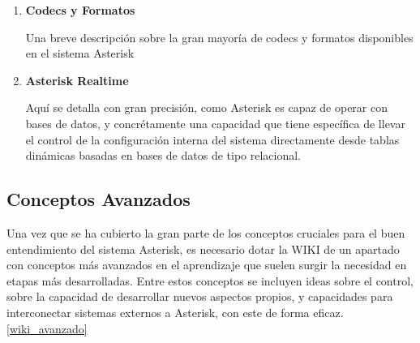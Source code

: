 \begin{enumerate}
	\item \textbf{Codecs y Formatos}
	
	Una breve descripción sobre la gran mayoría de codecs y formatos disponibles en el sistema Asterisk
	
	\item \textbf{Asterisk Realtime}
	
	Aquí se detalla con gran precisión, como Asterisk es capaz de operar con bases de datos, y concrétamente una capacidad que tiene específica de llevar el control de la configuración interna del sistema directamente desde tablas dinámicas basadas en bases de datos de tipo relacional.
	
\end{enumerate}


\subsection{Conceptos Avanzados}

Una vez que se ha cubierto la gran parte de los conceptos cruciales para el buen entendimiento del sistema Asterisk, es necesario dotar la WIKI de un apartado con conceptos más avanzados en el aprendizaje que suelen surgir la necesidad en etapas más desarrolladas. Entre estos conceptos se incluyen ideas sobre el control, sobre la capacidad de desarrollar nuevos aspectos propios, y capacidades para interconectar sistemas externos a Asterisk, con este de forma eficaz. \ref{wiki_avanzado}

